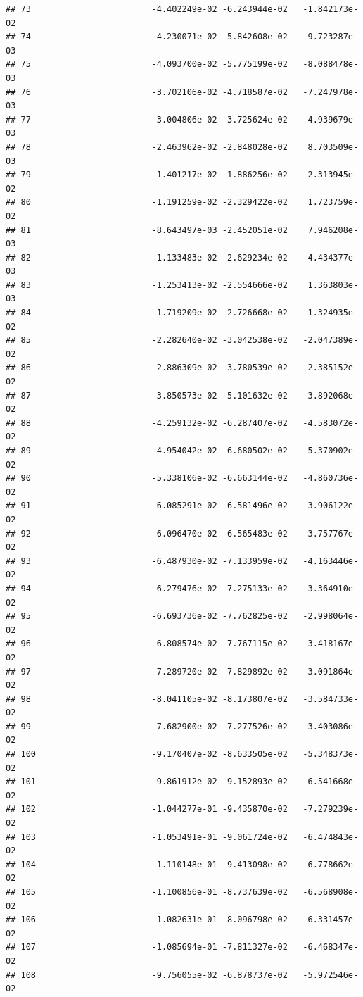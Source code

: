 \documentclass[
]{article}
\begin{document}
\begin{verbatim}
## 73                        -4.402249e-02 -6.243944e-02   -1.842173e-02
## 74                        -4.230071e-02 -5.842608e-02   -9.723287e-03
## 75                        -4.093700e-02 -5.775199e-02   -8.088478e-03
## 76                        -3.702106e-02 -4.718587e-02   -7.247978e-03
## 77                        -3.004806e-02 -3.725624e-02    4.939679e-03
## 78                        -2.463962e-02 -2.848028e-02    8.703509e-03
## 79                        -1.401217e-02 -1.886256e-02    2.313945e-02
## 80                        -1.191259e-02 -2.329422e-02    1.723759e-02
## 81                        -8.643497e-03 -2.452051e-02    7.946208e-03
## 82                        -1.133483e-02 -2.629234e-02    4.434377e-03
## 83                        -1.253413e-02 -2.554666e-02    1.363803e-03
## 84                        -1.719209e-02 -2.726668e-02   -1.324935e-02
## 85                        -2.282640e-02 -3.042538e-02   -2.047389e-02
## 86                        -2.886309e-02 -3.780539e-02   -2.385152e-02
## 87                        -3.850573e-02 -5.101632e-02   -3.892068e-02
## 88                        -4.259132e-02 -6.287407e-02   -4.583072e-02
## 89                        -4.954042e-02 -6.680502e-02   -5.370902e-02
## 90                        -5.338106e-02 -6.663144e-02   -4.860736e-02
## 91                        -6.085291e-02 -6.581496e-02   -3.906122e-02
## 92                        -6.096470e-02 -6.565483e-02   -3.757767e-02
## 93                        -6.487930e-02 -7.133959e-02   -4.163446e-02
## 94                        -6.279476e-02 -7.275133e-02   -3.364910e-02
## 95                        -6.693736e-02 -7.762825e-02   -2.998064e-02
## 96                        -6.808574e-02 -7.767115e-02   -3.418167e-02
## 97                        -7.289720e-02 -7.829892e-02   -3.091864e-02
## 98                        -8.041105e-02 -8.173807e-02   -3.584733e-02
## 99                        -7.682900e-02 -7.277526e-02   -3.403086e-02
## 100                       -9.170407e-02 -8.633505e-02   -5.348373e-02
## 101                       -9.861912e-02 -9.152893e-02   -6.541668e-02
## 102                       -1.044277e-01 -9.435870e-02   -7.279239e-02
## 103                       -1.053491e-01 -9.061724e-02   -6.474843e-02
## 104                       -1.110148e-01 -9.413098e-02   -6.778662e-02
## 105                       -1.100856e-01 -8.737639e-02   -6.568908e-02
## 106                       -1.082631e-01 -8.096798e-02   -6.331457e-02
## 107                       -1.085694e-01 -7.811327e-02   -6.468347e-02
## 108                       -9.756055e-02 -6.878737e-02   -5.972546e-02

\end{verbatim}
\end{document}
